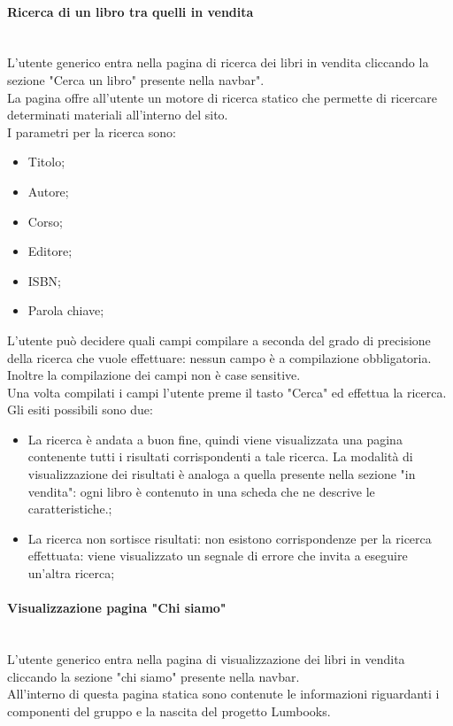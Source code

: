 \paragraph{Ricerca di un libro tra quelli in vendita}\mbox{}\\
\label{par:RicercaLibro}
L'utente generico entra nella pagina di ricerca dei libri in vendita cliccando la sezione "Cerca un libro" presente nella navbar".\\
La pagina offre all'utente un motore di ricerca statico che permette di ricercare determinati materiali all'interno del sito.\\
I parametri per la ricerca sono:
\begin{itemize}
	\item Titolo;
	\item Autore;
	\item Corso;
	\item Editore;
	\item ISBN;
	\item Parola chiave;
\end{itemize}
L'utente può decidere quali campi compilare a seconda del grado di precisione della ricerca che vuole effettuare: nessun campo è a compilazione obbligatoria. Inoltre la compilazione dei campi non è case sensitive.\\
Una volta compilati i campi l'utente preme il tasto "Cerca" ed effettua la ricerca. Gli esiti possibili sono due:
\begin{itemize}
	\item La ricerca è andata a buon fine, quindi viene visualizzata una pagina contenente tutti i risultati corrispondenti a tale ricerca. La modalità di visualizzazione dei risultati è analoga a quella presente nella sezione "in vendita": ogni libro è contenuto in una scheda che ne descrive le caratteristiche.;
	\item La ricerca non sortisce risultati: non esistono corrispondenze per la ricerca effettuata: viene visualizzato un segnale di errore che invita a eseguire un'altra ricerca;
	
\end{itemize}

\paragraph{Visualizzazione pagina "Chi siamo"}\mbox{}\\
\label{par:VisAbout}
L'utente generico entra nella pagina di visualizzazione dei libri in vendita cliccando la sezione "chi siamo" presente nella navbar.\\
All'interno di questa pagina statica sono contenute le informazioni riguardanti i componenti del gruppo e la nascita del progetto Lumbooks.

